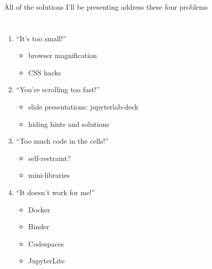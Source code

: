\documentclass[aspectratio=169]{beamer}
\begin{document}
\begin{frame}{All of the solutions I'll be presenting address these four problems}
\Large
\vspace{0.5 cm}
\begin{columns}
\begin{enumerate}\setlength{\itemsep}{0.35 cm}
\item ``It's too small!''
\begin{itemize}
\item<2-> browser magnification
\item<2-> CSS hacks
\end{itemize}

\item ``You're scrolling too fast!''
\begin{itemize}
\item<2-> slide presentations: jupyterlab-deck
\item<2-> hiding hints and solutions
\end{itemize}

\item ``Too much code in the cells!''
\begin{itemize}
\item<2-> self-restraint?
\item<2-> mini-libraries
\end{itemize}

\item ``It doesn't work for me!''
\begin{itemize}
\item<2-> Docker
\item<2-> Binder
\item<2-> Codespaces
\item<2-> JupyterLite
\end{itemize}
\end{enumerate}
\end{columns}
\end{frame}
\end{document}
